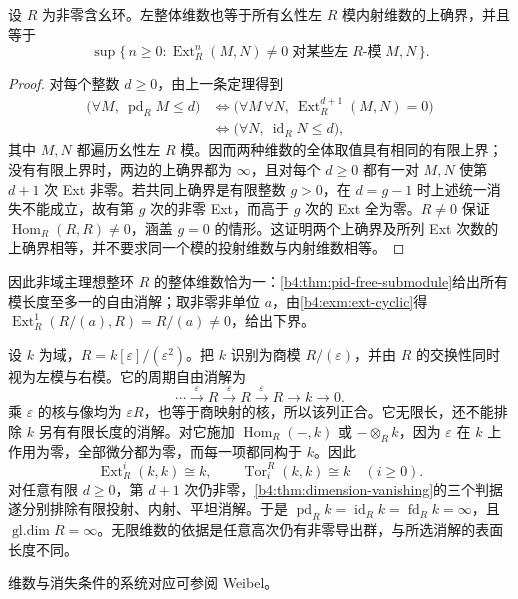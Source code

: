 \begin{corollary}\label{b4:cor:global-dimension-ext}
	设 \(R\) 为非零含幺环。左整体维数也等于所有幺性左 \(R\) 模内射维数的上确界，并且等于
	\[
		\sup\{\,n\ge0:\operatorname{Ext}_R^n(M,N)\ne0 \;\text{对某些左}\;R\text{-模}\;M,N\,\}.
	\]
\end{corollary}
\begin{proof}
	对每个整数 \(d\ge0\)，由上一条定理得到
	\[
		\begin{aligned}
			\bigl(\forall M,\ \operatorname{pd}_RM\le d\bigr) &\Longleftrightarrow \bigl(\forall M\,\forall N,\ \operatorname{Ext}_R^{d+1}(M,N)=0\bigr)\\
			&\Longleftrightarrow \bigl(\forall N,\ \operatorname{id}_RN\le d\bigr),
		\end{aligned}
	\]
	其中 \(M,N\) 都遍历幺性左 \(R\) 模。因而两种维数的全体取值具有相同的有限上界；没有有限上界时，两边的上确界都为 \(\infty\)，且对每个 \(d\ge0\) 都有一对 \(M,N\) 使第 \(d+1\) 次 Ext 非零。若共同上确界是有限整数 \(g>0\)，在 \(d=g-1\) 时上述统一消失不能成立，故有第 \(g\) 次的非零 Ext，而高于 \(g\) 次的 Ext 全为零。\(R\ne0\) 保证 \(\operatorname{Hom}_R(R,R)\ne0\)，涵盖 \(g=0\) 的情形。这证明两个上确界及所列 Ext 次数的上确界相等，并不要求同一个模的投射维数与内射维数相等。
\end{proof}

因此非域主理想整环 \(R\) 的整体维数恰为一：\cref{b4:thm:pid-free-submodule}给出所有模长度至多一的自由消解；取非零非单位 \(a\)，由\cref{b4:exm:ext-cyclic}得 \(\operatorname{Ext}_R^1(R/(a),R)=R/(a)\ne0\)，给出下界。

\begin{example}\label{b4:exm:infinite-dimension-dual-numbers}
	设 \(k\) 为域，\(R=k[\varepsilon]/(\varepsilon^2)\)。把 \(k\) 识别为商模 \(R/(\varepsilon)\)，并由 \(R\) 的交换性同时视为左模与右模。它的周期自由消解为
	\[
		\cdots\xrightarrow{\varepsilon}R\xrightarrow{\varepsilon}R \xrightarrow{\varepsilon}R\longrightarrow k\longrightarrow0.
	\]
	乘 \(\varepsilon\) 的核与像均为 \(\varepsilon R\)，也等于商映射的核，所以该列正合。它无限长，还不能排除 \(k\) 另有有限长度的消解。对它施加 \(\operatorname{Hom}_R(-,k)\) 或 \(-\otimes_Rk\)，因为 \(\varepsilon\) 在 \(k\) 上作用为零，全部微分都为零，而每一项都同构于 \(k\)。因此
	\[
		\operatorname{Ext}_R^i(k,k)\cong k, \qquad \operatorname{Tor}_i^R(k,k)\cong k \quad(i\ge0).
	\]
	对任意有限 \(d\ge0\)，第 \(d+1\) 次仍非零，\cref{b4:thm:dimension-vanishing}的三个判据遂分别排除有限投射、内射、平坦消解。于是 \(\operatorname{pd}_Rk=\operatorname{id}_Rk=\operatorname{fd}_Rk=\infty\)，且 \(\operatorname{gl.dim}R=\infty\)。无限维数的依据是任意高次仍有非零导出群，与所选消解的表面长度不同。
\end{example}

维数与消失条件的系统对应可参阅 Weibel\cite[Section 4.1, pd Lemma 4.1.6, id Lemma 4.1.8, fd Lemma 4.1.10]{Weibel1994HomologicalAlgebra}。
